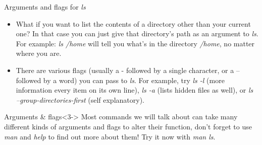 \documentclass{beamer}
\begin{document}
\begin{frame}{Arguments and flags for \emph{ls}}
\begin{itemize}
    \item<1-> What if you want to list the contents of a directory other than your current one? In that case you can just give that directory's path as an \alert{argument} to \emph{ls}. For example: \emph{ls /home} will tell you what's in the directory \textit{/home}, no matter where you are.
    \item<2-> There are various \alert{flags} (usually a - followed by a single character, or a -- followed by a word) you can pass to \emph{ls}. For example, try \emph{ls -l} (more information every item on its own line), \emph{ls -a} (lists hidden files as well), or \emph{ls --group-directories-first} (self explanatory). 
\end{itemize}
\begin{block}{Arguments \& flags}<3-> 
Most commands we will talk about can take many different kinds of arguments and flags to alter their function, don't forget to use \emph{man} and \emph{help} to find out more about them! Try it now with \emph{man ls}. 
\end{block}
\end{frame}
\end{document}
